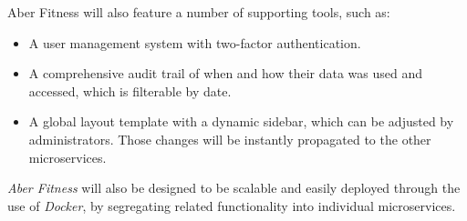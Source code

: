 \par
Aber Fitness will also feature a number of supporting tools, such as:

\begin{itemize}
	\item A user management system with two-factor authentication.
	\item A comprehensive audit trail of when and how their data was used and accessed, which is filterable by date.
	\item A global layout template with a dynamic sidebar, which can be adjusted by administrators. Those changes will be instantly propagated to the other microservices.
\end{itemize}

\par
\textit{Aber Fitness} will also be designed to be scalable and easily deployed through the use of \textit{Docker}, by segregating related functionality into individual microservices.
